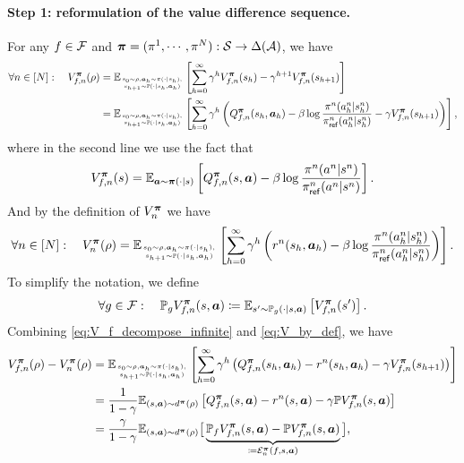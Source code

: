 \paragraph{Step 1: reformulation of the value difference sequence.}
For any $f\in{\mathcal{F}}$ and ${\bm{\pi}}=(\pi^1,\cdots,\pi^N):{\mathcal{S}}\rightarrow\Delta({\mathcal{A}})$, we have
\begin{align}\label{eq:V_f_decompose_infinite}
    \forall n\in[N]:\quad V_{f,n}^{{\bm{\pi}}}(\rho) &= \mathbb{E}_{s_0\sim\rho,{\bm{a}}_h\sim\pi(\cdot|s_h),\atop s_{h+1}\sim{\mathbb P}(\cdot|s_h,{\bm{a}}_h)}\left[\sum_{h=0}^\infty \gamma^h V_{f,n}^{{\bm{\pi}}}(s_h)-\gamma^{h+1} V_{f,n}^{{\bm{\pi}}}(s_{h+1})\right]\notag\\
    &=\mathbb{E}_{s_0\sim\rho,{\bm{a}}_h\sim\pi(\cdot|s_h),\atop s_{h+1}\sim{\mathbb P}(\cdot|s_h,{\bm{a}}_h)}\left[\sum_{h=0}^\infty \gamma^h\left( Q_{f,n}^{{\bm{\pi}}}(s_h,{\bm{a}}_h)-\beta\log\frac{\pi^n(a_h^n|s_h^n)}{\pi_{\mathsf{ref}}^n(a_h^n|s_h^n)} -\gamma V_{f,n}^{\bm{\pi}}(s_{h+1})\right)\right],
\end{align}
where in the second line we use the fact that
$$V_{f,n}^{\bm{\pi}} (s)=\mathbb{E}_{{\bm{a}}\sim{\bm{\pi}}(\cdot|s)}\left[Q_{f,n}^{\bm{\pi}}(s,{\bm{a}})-\beta\log\frac{\pi^n(a^n|s^n)}{\pi_{\mathsf{ref}}^n(a^n|s^n)}\right].$$
And by the definition of $V_{n}^{{\bm{\pi}}}$ we have
\begin{align}\label{eq:V_by_def_infinite}
    \forall n\in[N]:\quad V_{n}^{{\bm{\pi}}}(\rho) = \mathbb{E}_{s_0\sim\rho,{\bm{a}}_h\sim\pi(\cdot|s_h),\atop s_{h+1}\sim {\mathbb P}(\cdot|s_h,{\bm{a}}_h)}\left[\sum_{h=0}^\infty \gamma^h \left(r^n(s_h,{\bm{a}}_h)-\beta\log\frac{\pi^n(a_h^n|s_h^n)}{\pi_{\mathsf{ref}}^n(a_h^n|s_h^n)}\right)\right].
\end{align}
To simplify the notation, we define
\begin{align}\label{eq:Ppushforward_infinite}
    \forall g\in{\mathcal{F}}:\quad{\mathbb P}_g V_{f,n}^{{\bm{\pi}}}(s,{\bm{a}})\coloneqq \mathbb{E}_{s'\sim{\mathbb P}_g(\cdot|s,{\bm{a}})}\left[V_{f,n}^{{\bm{\pi}}}(s')\right].
\end{align}
Combining \eqref{eq:V_f_decompose_infinite} and \eqref{eq:V_by_def}, we have
\begin{align}\label{eq:V_to_res_infinite}
    V_{f,n}^{{\bm{\pi}}}(\rho) - V_{n}^{{\bm{\pi}}}(\rho) &= \mathbb{E}_{s_0\sim\rho,{\bm{a}}_h\sim\pi(\cdot|s_h),\atop s_{h+1}\sim{\mathbb P}(\cdot|s_h,{\bm{a}}_h)}\left[\sum_{h=0}^\infty \gamma^h\left( Q_{f,n}^{{\bm{\pi}}}(s_h,{\bm{a}}_h) - r^n(s_h,{\bm{a}}_h) - \gamma V_{f,n}^{\bm{\pi}}(s_{h+1})\right)\right]\notag\\
&= \frac{1}{1-\gamma}\mathbb{E}_{(s,{\bm{a}})\sim d^{\bm{\pi}}(\rho)}\left[Q_{f,n}^{{\bm{\pi}}}(s,{\bm{a}}) - r^n(s,{\bm{a}}) - \gamma {\mathbb P} V_{f,n}^{\bm{\pi}}(s,{\bm{a}})\right]\notag\\
&= \frac{\gamma}{1-\gamma}\mathbb{E}_{(s,{\bm{a}})\sim d^{\bm{\pi}}(\rho)}\big[\underbrace{{\mathbb P}_f V_{f,n}^{\bm{\pi}}(s,{\bm{a}})-{\mathbb P} V_{f,n}^{\bm{\pi}}(s,{\bm{a}})}_{\coloneqq {\mathcal{E}}_n^{\bm{\pi}}(f,s,{\bm{a}})}\big],
\end{align}
